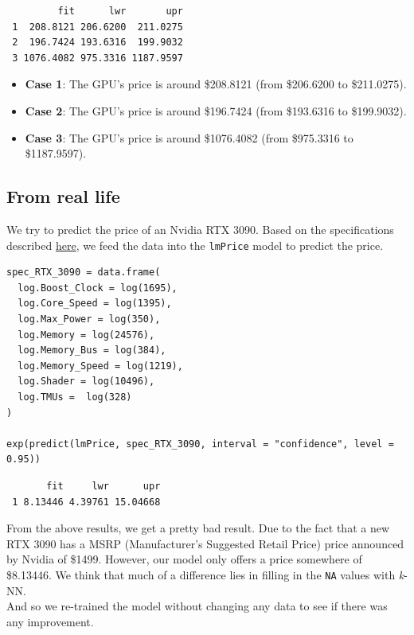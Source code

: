 \documentclass[a4paper]{article}
\begin{document}
\begin{lstlisting}
         fit      lwr       upr
 1  208.8121 206.6200  211.0275
 2  196.7424 193.6316  199.9032
 3 1076.4082 975.3316 1187.9597
\end{lstlisting}
\begin{itemize}
    \item \textbf{Case 1}: The GPU's price is around \$208.8121  (from \$206.6200 to \$211.0275).
    \item \textbf{Case 2}: The GPU's price is around \$196.7424  (from \$193.6316 to \$199.9032).
    \item \textbf{Case 3}: The GPU's price is around \$1076.4082  (from \$975.3316 to \$1187.9597).
\end{itemize}

\subsection{From real life}
We try to predict the price of an Nvidia RTX 3090. Based on the specifications described \href{https://www.techpowerup.com/gpu-specs/geforce-rtx-3090.c3622}{here}, we feed the data into the \verb|lmPrice| model to predict the price.
\begin{mdframed}[leftline=false,rightline=false,backgroundcolor=lightblue!10,nobreak=false]
    \begin{verbatim}
spec_RTX_3090 = data.frame(
  log.Boost_Clock = log(1695),
  log.Core_Speed = log(1395),
  log.Max_Power = log(350),
  log.Memory = log(24576),
  log.Memory_Bus = log(384),
  log.Memory_Speed = log(1219),
  log.Shader = log(10496),
  log.TMUs =  log(328)
)

exp(predict(lmPrice, spec_RTX_3090, interval = "confidence", level = 0.95))
    \end{verbatim}
\end{mdframed}

\begin{lstlisting}
       fit     lwr      upr
 1 8.13446 4.39761 15.04668
\end{lstlisting}
From the above results, we get a pretty bad result. Due to the fact that a new RTX 3090 has a MSRP (Manufacturer's Suggested Retail Price) price announced by Nvidia of \$1499. However, our model only offers a price somewhere of \$8.13446. We think that much of a difference lies in filling in the \verb|NA| values with \textit{k}-NN.\\
And so we re-trained the model without changing any data to see if there was any improvement.
\end{document}

